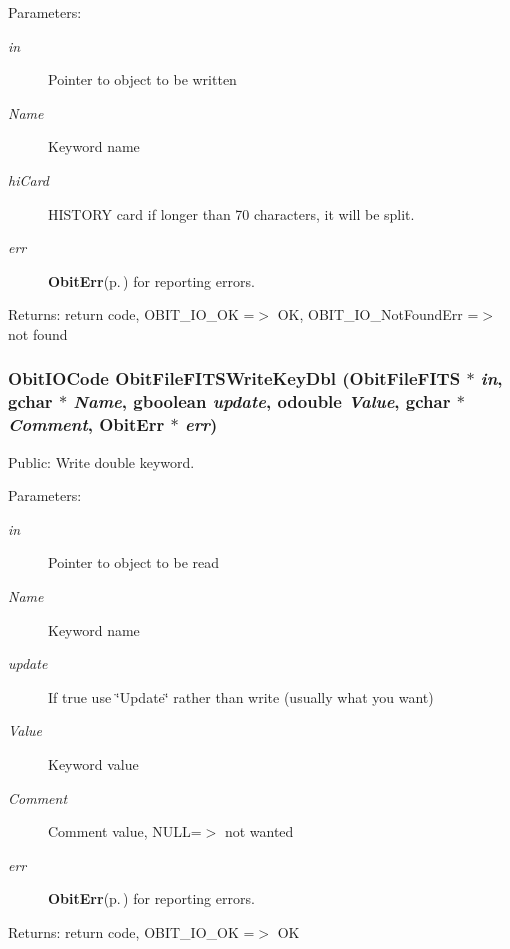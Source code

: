 \begin{Desc}
\item[Parameters:]
\begin{description}
\item[{\em in}]Pointer to object to be written \item[{\em Name}]Keyword name \item[{\em hi\-Card}]HISTORY card if longer than 70 characters, it will be split. \item[{\em err}]{\bf Obit\-Err}{\rm (p.\,\pageref{structObitErr})} for reporting errors. \end{description}
\end{Desc}
\begin{Desc}
\item[Returns:]return code, OBIT\_\-IO\_\-OK =$>$ OK, OBIT\_\-IO\_\-Not\-Found\-Err =$>$ not found \end{Desc}
\subsubsection{\setlength{\rightskip}{0pt plus 5cm}Obit\-IOCode Obit\-File\-FITSWrite\-Key\-Dbl ({\bf Obit\-File\-FITS} $\ast$ {\em in}, gchar $\ast$ {\em Name}, gboolean {\em update}, {\bf odouble} {\em Value}, gchar $\ast$ {\em Comment}, {\bf Obit\-Err} $\ast$ {\em err})}\label{ObitFileFITS_8c_a24}


Public: Write double keyword. 

\begin{Desc}
\item[Parameters:]
\begin{description}
\item[{\em in}]Pointer to object to be read \item[{\em Name}]Keyword name \item[{\em update}]If true use \char`\"{}Update\char`\"{} rather than write (usually what you want) \item[{\em Value}]Keyword value \item[{\em Comment}]Comment value, NULL=$>$ not wanted \item[{\em err}]{\bf Obit\-Err}{\rm (p.\,\pageref{structObitErr})} for reporting errors. \end{description}
\end{Desc}
\begin{Desc}
\item[Returns:]return code, OBIT\_\-IO\_\-OK =$>$ OK \end{Desc}

